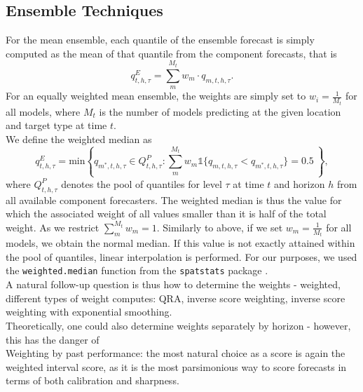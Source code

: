 \subsection{Ensemble Techniques}
For the mean ensemble, each quantile of the ensemble forecast is simply computed as the mean of that quantile from the component forecasts, that is
\begin{equation}
q^E_{t,h,\tau} = \sum_m^{M_t} w_m \cdot q_{m, t, h, \tau}.
\end{equation}
For an equally weighted mean ensemble, the weights are simply set to $w_i = \frac{1}{M_t}$ for all models, where $M_t$ is the number of models predicting at the given location and target type at time $t$.  \\
We define the weighted median as 
\begin{equation}
q^E_{t,h,\tau} = \text{min}\left\{q_{m^{*},t,h,\tau} \in Q^P_{t,h,\tau}: \sum_m^{M_t}  w_m \mathbb{1}\{q_{m,t,h,\tau} < q_{m^{*},t,h,\tau} \} = 0.5 \ \right\},
\end{equation}
where $Q^P_{t,h,\tau}$ denotes the pool of quantiles for level $\tau$ at time $t$ and horizon $h$ from all available component forecasters. The weighted median is thus the value for which the associated weight of all values smaller than it is half of the total weight. As we restrict $\sum_m^{M_t}w_m = 1$. Similarly to above, if we set $w_m = \frac{1}{M_t}$ for all models, we obtain the normal median. If this value is not exactly attained within the pool of quantiles, linear interpolation is performed. For our purposes, we used the \texttt{weighted.median} function from the \texttt{spatstats} package \citep{baddeley_spatstat_2005}.\\
A natural follow-up question is thus how to determine the weights 
- weighted, different types of weight computes: QRA, inverse score weighting, inverse score weighting with exponential smoothing. \\
Theoretically, one could also determine weights separately by horizon - however, this has the danger of \\
Weighting by past performance: the most natural choice as a score is again the weighted interval score, as it is the most parsimonious way to score forecasts in terms of both calibration and sharpness. 
